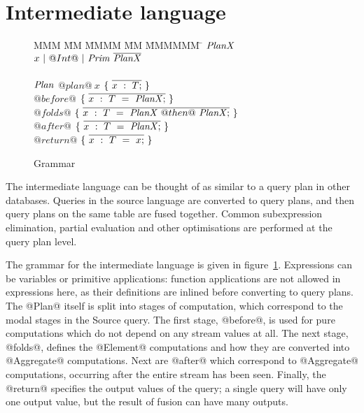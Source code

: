 \section{Intermediate language}
\label{s:IcicleCore}

\begin{figure}

\begin{tabbing}
MMM \= MM \= MMMM \= MM \= MMMMMM \= \kill
$\mathit{PlanX}$
\GrammarDef
  $x~|~@Int@~|~\mathit{Prim}~\overline{\mathit{PlanX}}$
\\
\\
$\mathit{Plan}$
\GrammarDef
  $@plan@~x$ \> $\{~\overline{x~:~T;}~\}$
\\
  \> \> $@before@$ \> $\{~\overline{x~:~T~=~\mathit{PlanX};}~\}$ \\
  \> \> $@folds@$  \> $\{~\overline{x~:~T~=~\mathit{PlanX}~@then@~\mathit{PlanX};}~\}$ \\
  \> \> $@after@$  \> $\{~\overline{x~:~T~=~\mathit{PlanX};}~\}$ \\
  \> \> $@return@$ \> $\{~\overline{x~:~T~=~x;}~\}$ \\
\end{tabbing}



\caption{Grammar}
\label{fig:core:grammar}
\end{figure}

The intermediate language can be thought of as similar to a query plan in other databases.
Queries in the source language are converted to query plans, and then query plans on the same table are fused together.
Common subexpression elimination, partial evaluation and other optimisations are performed at the query plan level.

The grammar for the intermediate language is given in figure~\ref{fig:core:grammar}.
Expressions can be variables or primitive applications: function applications are not allowed in expressions here, as their definitions are inlined before converting to query plans.
The @Plan@ itself is split into stages of computation, which correspond to the modal stages in the Source query.
The first stage, @before@, is used for pure computations which do not depend on any stream values at all.
The next stage, @folds@, defines the @Element@ computations and how they are converted into @Aggregate@ computations.
Next are @after@ which correspond to @Aggregate@ computations, occurring after the entire stream has been seen.
Finally, the @return@ specifies the output values of the query; a single query will have only one output value, but the result of fusion can have many outputs.

